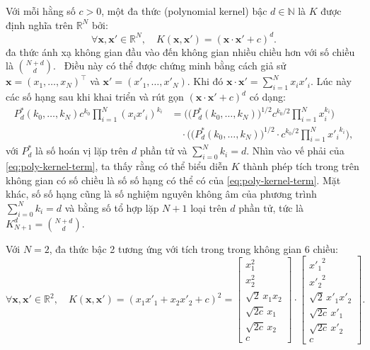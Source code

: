 \begin{exmp}
  Với mỗi hằng số $c > 0$, một  đa thức (polynomial kernel) bậc
  $d\in\mathbb{N}$ là  $K$ được định nghĩa trên $\mathbb{R}^N$ bởi:
  \begin{equation}
    \forall\mathbf{x},\mathbf{x}'\in\mathbb{R}^N,\quad
    K(\mathbf{x},\mathbf{x}') = (\mathbf{x}\cdot\mathbf{x}' + c)^d.
  \end{equation}  đa thức ánh xạ không gian đầu vào đến không gian
  nhiều chiều hơn với số chiều là $\binom{N+d}{d}$. \elaborate\ Điều này có thể
  được chứng minh bằng cách giả sử $\mathbf{x} = (x_1,\dots,x_N)^\intercal$ và
  $\mathbf{x}' = (x'_1,\dotsc,x'_N)$. Khi đó $\mathbf{x}\cdot\mathbf{x}' =
  \sum_{i=1}^Nx_ix'_i$. Lúc này các số hạng sau khi khai triển và rút gọn
  $(\mathbf{x}\cdot\mathbf{x}' + c)^d$ có dạng:
  \begin{equation}\label{eq:poly-kernel-term}\begin{split}
    P^\ast_d(k_0,\dots,k_N) c^{k_0}\prod_{i=1}^N(x_ix'_i)^{k_i} &=
      \biggl(\bigl(P^\ast_d(k_0,\dots,k_N)\bigr)^{1/2} c^{k_0/2}
      \prod_{i=1}^Nx_i^{k_i} \biggr) \\
    &\quad\cdot\biggl(\bigl(P^\ast_d(k_0,\dots,k_N)\bigr)^{1/2} \cdot
      c^{k_0/2}\prod_{i=1}^N{x'_i}^{k_i} \biggr),
  \end{split}\end{equation}với $P^\ast_d$ là số hoán vị lặp trên $d$ phần tử và
  $\sum_{i=0}^Nk_i = d$. Nhìn vào vế phải của \eqref{eq:poly-kernel-term},
  ta thấy rằng có thể biểu diễn $K$ thành phép tích trong trên không gian có
  số chiều là số số hạng có thể có của \eqref{eq:poly-kernel-term}. Mặt khác,
  số số hạng cũng là số nghiệm nguyên không âm của phương trình
  $\sum_{i=0}^Nk_i = d$ và bằng số tổ hợp lặp $N+1$ loại trên $d$ phần tử, tức
  là $K^d_{N+1} = \binom{N+d}{d}$.

  Với $N = 2$,  đa thức bậc 2 tương ứng với tích trong trong không
  gian 6 chiều: \begin{equation}
    \forall\mathbf{x},\mathbf{x}'\in\mathbb{R}^2,\quad
    K(\mathbf{x},\mathbf{x}') = (x_1x'_1+x_2x'_2+c)^2 = \begin{bmatrix}
      x_1^2 \\ x_2^2 \\ \sqrt{2}\,x_1x_2 \\ \sqrt{2c}\,x_1 \\ \sqrt{2c}\,x_2 \\
      c
    \end{bmatrix} \cdot \begin{bmatrix}
      {x'_1}^2 \\ {x'_2}^2 \\ \sqrt{2}\,x'_1x'_2 \\ \sqrt{2c}\,x'_1 \\
      \sqrt{2c}\, x'_2 \\ c
    \end{bmatrix}.
  \end{equation}


\end{exmp}
